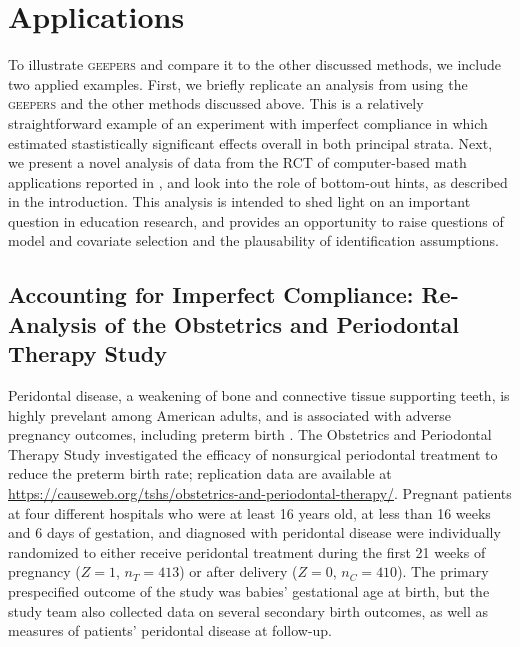 \documentclass[]{article}
\begin{document}
\section{Applications}
To illustrate \textsc{geepers} and compare it to the other discussed methods, we include two applied examples.
First, we briefly replicate an analysis from \citet{richardson2023estimating} using the \textsc{geepers} and the other methods discussed above.
This is a relatively straightforward example of an experiment with imperfect compliance in which \citet{richardson2023estimating} estimated stastistically significant effects overall in both principal strata.
Next, we present a novel analysis of data from the RCT of computer-based math applications reported in \citet{impactPaper}, and look into the role of bottom-out hints, as described in the introduction.
This analysis is intended to shed light on an important question in education research, and provides an opportunity to raise questions of model and covariate selection and the plausability of identification assumptions. 

\subsection{Accounting for Imperfect Compliance: Re-Analysis of the Obstetrics and Periodontal Therapy Study}
Peridontal disease, a weakening of bone and connective tissue supporting teeth, is highly prevelant among American adults, and is associated with adverse pregnancy outcomes, including preterm birth \citep{periodontalEpi}.
The Obstetrics and Periodontal Therapy Study \citep[(OPTS)][]{michalowicz2006treatment} investigated the efficacy of nonsurgical periodontal treatment to reduce the preterm birth rate; replication data are available at \url{https://causeweb.org/tshs/obstetrics-and-periodontal-therapy/}.
Pregnant patients at four different hospitals who were at least 16 years old, at less than 16 weeks and 6 days of gestation, and diagnosed with peridontal disease were individually randomized to either receive peridontal treatment during the first 21 weeks of pregnancy ($Z=1$, $n_T=413$) or after delivery ($Z=0$, $n_C=410$).
The primary prespecified outcome of the study was babies' gestational age at birth, but the study team also collected data on several secondary birth outcomes, as well as measures of patients' peridontal disease at follow-up.
\end{document}
